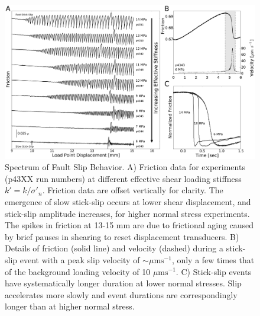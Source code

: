 \begin{figure}
	\centering
		\includegraphics[scale=0.25]{chap_lab_slow_eq/Figure_2.pdf}
   	\caption{Spectrum of Fault Slip Behavior. A) Friction data for experiments (p43XX run numbers) at different effective shear loading stiffness $k'=k/\sigma'_n$. Friction data are offset vertically for clarity. The emergence of slow stick-slip occurs at lower shear displacement, and stick-slip amplitude increases, for higher normal stress experiments. The spikes in friction at 13-15 mm are due to frictional aging caused by brief pauses in shearing to reset displacement transducers. B) Details of friction (solid line) and velocity (dashed) during a stick-slip event with a peak slip velocity of $\sim \mu \text{ms}^{-1}$, only a few times that of the background loading velocity of 10 $\mu \text{ms}^{-1}$. C) Stick-slip events have systematically longer duration at lower normal stresses. Slip accelerates more slowly and event durations are correspondingly longer than at higher normal stress.}
  	\label{Figure_2}
\end{figure}

